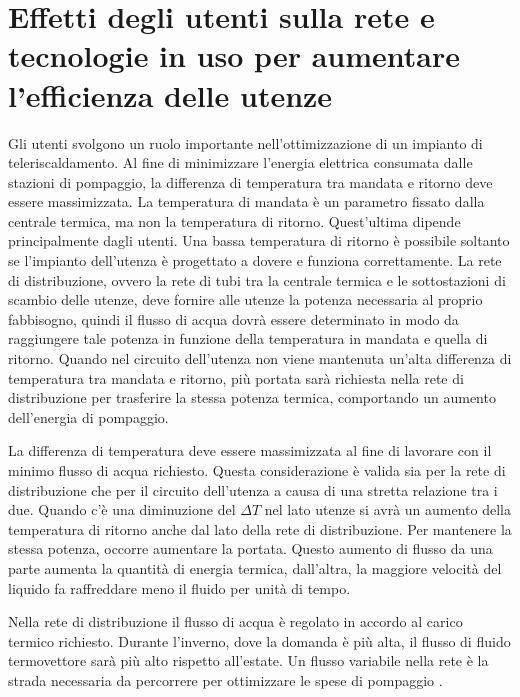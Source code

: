 \documentclass[laurea,oneside,11pt]{USiena_tesiLM3}
\begin{document}
\section{Effetti degli utenti sulla rete e tecnologie in uso per aumentare l'efficienza delle utenze}
Gli utenti svolgono un ruolo importante nell'ottimizzazione di un impianto di teleriscaldamento. Al fine di minimizzare l'energia elettrica consumata dalle stazioni di pompaggio, la differenza di temperatura tra mandata e ritorno deve essere massimizzata. La temperatura di mandata è un parametro fissato dalla centrale termica, ma non la temperatura di ritorno. Quest'ultima dipende principalmente dagli utenti. Una bassa temperatura di ritorno è possibile soltanto se l'impianto dell'utenza è progettato a dovere e funziona correttamente.
La rete di distribuzione, ovvero la rete di tubi tra la centrale termica e le sottostazioni di scambio delle utenze, deve fornire alle utenze la potenza necessaria al proprio fabbisogno, quindi il flusso di acqua dovrà essere determinato in modo da raggiungere tale potenza in funzione della temperatura in mandata e quella di ritorno. Quando nel circuito dell'utenza non viene mantenuta un'alta differenza di temperatura tra mandata e ritorno, più portata sarà richiesta nella rete di distribuzione per trasferire la stessa potenza termica,
comportando un aumento dell'energia di pompaggio.

La differenza di temperatura deve essere massimizzata al fine di lavorare con il minimo flusso di acqua richiesto. Questa considerazione è valida sia per la rete di distribuzione che per il circuito dell'utenza a causa di una stretta relazione tra i due. 
Quando c'è una diminuzione del $\Delta T$ nel lato utenze si avrà un aumento della temperatura di ritorno anche dal lato della rete di distribuzione. Per mantenere la stessa potenza, occorre aumentare la portata. Questo aumento di flusso da una parte aumenta la quantità di energia termica, dall'altra, la maggiore velocità del liquido fa raffreddare meno il fluido per unità di tempo. 

Nella rete di distribuzione il flusso di acqua è regolato in accordo al carico termico richiesto. Durante l'inverno, dove la domanda è più alta, il flusso di fluido termovettore sarà più alto rispetto all'estate. Un flusso variabile nella rete è la strada necessaria da percorrere per ottimizzare le spese di pompaggio \cite{woods1999optimisation}.
\end{document}
